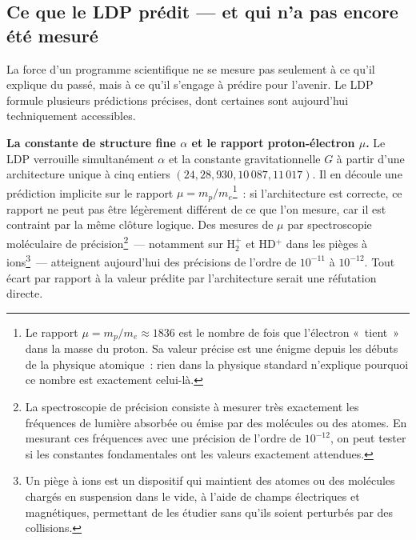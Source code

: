 \documentclass[12pt, a4paper, openright]{book}
\begin{document}
\subsection*{Ce que le LDP prédit --- et qui n'a pas encore été mesuré}

La force d'un programme scientifique ne se mesure pas seulement à ce qu'il explique du passé, mais à ce qu'il s'engage à prédire pour l'avenir. Le LDP formule plusieurs prédictions précises, dont certaines sont aujourd'hui techniquement accessibles.

\medskip

\textbf{La constante de structure fine $\alpha$ et le rapport proton-électron $\mu$.} Le LDP verrouille simultanément $\alpha$ et la constante gravitationnelle $G$ à partir d'une architecture unique à cinq entiers $(24, 28, 930, 10\,087, 11\,017)$. Il en découle une prédiction implicite sur le rapport $\mu = m_p / m_e$\footnote{Le rapport $\mu = m_p/m_e \approx 1836$ est le nombre de fois que l'électron «~tient~» dans la masse du proton. Sa valeur précise est une énigme depuis les débuts de la physique atomique~: rien dans la physique standard n'explique pourquoi ce nombre est exactement celui-là.}~: si l'architecture est correcte, ce rapport ne peut pas être légèrement différent de ce que l'on mesure, car il est contraint par la même clôture logique. Des mesures de $\mu$ par spectroscopie moléculaire de précision\footnote{La spectroscopie de précision consiste à mesurer très exactement les fréquences de lumière absorbée ou émise par des molécules ou des atomes. En mesurant ces fréquences avec une précision de l'ordre de $10^{-12}$, on peut tester si les constantes fondamentales ont les valeurs exactement attendues.}~--- notamment sur H$_2^+$ et HD$^+$ dans les pièges à ions\footnote{Un piège à ions est un dispositif qui maintient des atomes ou des molécules chargés en suspension dans le vide, à l'aide de champs électriques et magnétiques, permettant de les étudier sans qu'ils soient perturbés par des collisions.}~--- atteignent aujourd'hui des précisions de l'ordre de $10^{-11}$ à $10^{-12}$. Tout écart par rapport à la valeur prédite par l'architecture serait une réfutation directe.

\medskip
\end{document}
